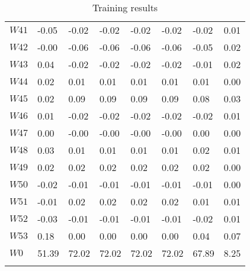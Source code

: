 \documentclass{article}
\begin{document}
\begin{longtable}{llllllll}
    $W41$    &   -0.05  & -0.02  & -0.02  & -0.02  & -0.02  & -0.02  & 0.01  \\
    $W42$    &   -0.00  & -0.06  & -0.06  & -0.06  & -0.06  & -0.05  & 0.02  \\
    $W43$    &   0.04   & -0.02  & -0.02  & -0.02  & -0.02  & -0.01  & 0.02  \\
    $W44$    &   0.02   & 0.01   & 0.01   & 0.01   & 0.01   & 0.01   & 0.00  \\
    $W45$    &   0.02   & 0.09   & 0.09   & 0.09   & 0.09   & 0.08   & 0.03  \\
    $W46$    &   0.01   & -0.02  & -0.02  & -0.02  & -0.02  & -0.02  & 0.01  \\
    $W47$    &   0.00   & -0.00  & -0.00  & -0.00  & -0.00  & 0.00   & 0.00  \\
    $W48$    &   0.03   & 0.01   & 0.01   & 0.01   & 0.01   & 0.02   & 0.01  \\
    $W49$    &   0.02   & 0.02   & 0.02   & 0.02   & 0.02   & 0.02   & 0.00  \\
    $W50$    &   -0.02  & -0.01  & -0.01  & -0.01  & -0.01  & -0.01  & 0.00  \\
    $W51$    &   -0.01  & 0.02   & 0.02   & 0.02   & 0.02   & 0.01   & 0.01  \\
    $W52$    &   -0.03  & -0.01  & -0.01  & -0.01  & -0.01  & -0.02  & 0.01  \\
    $W53$    &   0.18   & 0.00   & 0.00   & 0.00   & 0.00   & 0.04   & 0.07  \\
    $W0$    &   51.39  & 72.02  & 72.02  & 72.02  & 72.02  & 67.89  & 8.25  \\
    \bottomrule
    \caption{Training results}
	\label{tab:acc}
\end{longtable}
\end{document}
